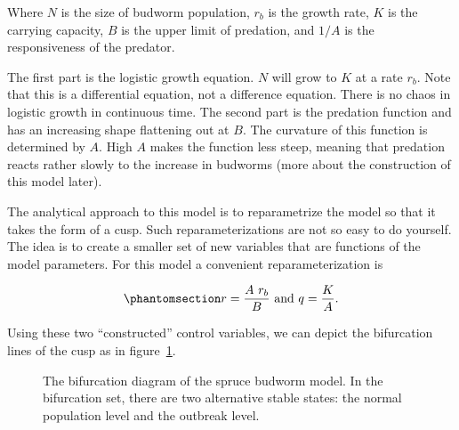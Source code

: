 \documentclass[
  a4paper,
  DIV=11,
  numbers=noendperiod,
  oneside]{scrreprt}
\begin{document}
Where \(N\) is the size of budworm population, \(r_{b}\) is the growth
rate, \(K\) is the carrying capacity, \(B\) is the upper limit of
predation, and \(1/A\) is the responsiveness of the predator.

The first part is the logistic growth equation. \(N\) will grow to \(K\)
at a rate \(r_{b}\). Note that this is a differential equation, not a
difference equation. There is no chaos in logistic growth in continuous
time. The second part is the predation function and has an increasing
shape flattening out at \(B\). The curvature of this function is
determined by \(A\). High \(A\) makes the function less steep, meaning
that predation reacts rather slowly to the increase in budworms (more
about the construction of this model later).

The analytical approach to this model is to reparametrize the model so
that it takes the form of a cusp. Such reparameterizations are not so
easy to do yourself. The idea is to create a smaller set of new
variables that are functions of the model parameters. For this model a
convenient reparameterization is

\begin{equation}\phantomsection\label{eq-ch3-8-old-12}{
r = \frac{A\ r_{b}}{B}\text{ and}\ q = \frac{K}{A}.
}\end{equation}

Using these two ``constructed'' control variables, we can depict the
bifurcation lines of the cusp as in figure~\ref{fig-ch3-img16-old-28}.

\begin{figure}


\caption{\label{fig-ch3-img16-old-28}The bifurcation diagram of the
spruce budworm model. In the bifurcation set, there are two alternative
stable states: the normal population level and the outbreak level.}

\end{figure}%
\end{document}
